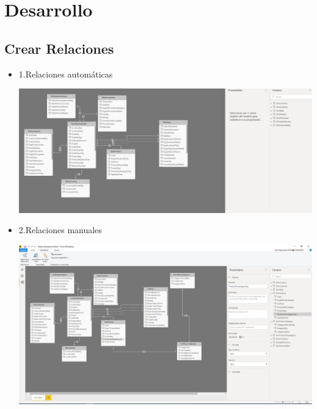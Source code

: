 \section{Desarrollo } 

\subsection {Crear Relaciones}
\begin{itemize}
 \item 1.Relaciones automáticas

	\begin{center}
	\includegraphics[width=18cm]{./Imagenes/Imagen1}
	\end{center}	


 \item 2.Relaciones manuales

	\begin{center}
	\includegraphics[width=18cm]{./Imagenes/Imagen2}
	\end{center}	
\end{itemize}

